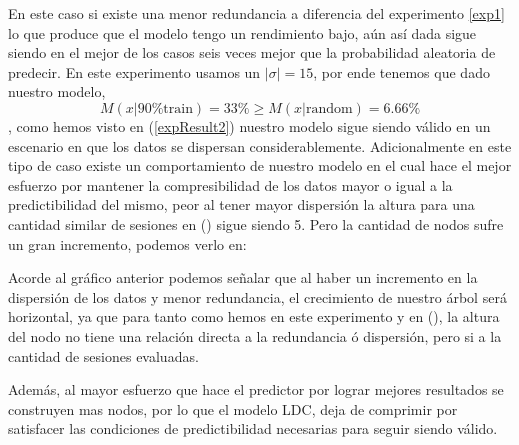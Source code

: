 \begin{enumerate}
	En este caso si existe una menor redundancia a diferencia del experimento \ref{exp1} lo que produce que el modelo tengo un rendimiento bajo, aún así dada sigue siendo en el mejor de los casos seis veces mejor que la probabilidad aleatoria de predecir. En este experimento usamos un $|\sigma| =15$, por ende tenemos que dado nuestro modelo,
	\begin{equation}\label{expResult2}
		M( x | \mbox{90\% train}  ) = 33 \% \geq M( x | \mbox{random}  ) = 6.66\% 
	\end{equation}, como hemos visto en (\ref{expResult2}) nuestro modelo sigue siendo válido en un escenario en que los datos se dispersan considerablemente. 
	Adicionalmente en este tipo de caso existe un comportamiento de nuestro modelo en el cual hace el mejor esfuerzo por mantener la compresibilidad de los datos mayor o igual a la predictibilidad del mismo, peor al tener mayor dispersión la altura para una cantidad similar de sesiones en (\label{expResult2}) sigue siendo 5. Pero la cantidad de nodos sufre un gran incremento, podemos verlo en:
	
	
	


	Acorde al gráfico anterior podemos señalar que al haber un incremento en la dispersión de los datos y menor redundancia, el crecimiento de nuestro árbol será horizontal, ya que para tanto como hemos en este experimento y en (\label{expResult2}), la altura del nodo no tiene una relación directa a la redundancia ó dispersión, pero si a la cantidad de sesiones evaluadas. 
	
	Además, al mayor esfuerzo que hace el predictor por lograr mejores resultados se construyen mas nodos, por lo que el modelo LDC, deja de comprimir por satisfacer las condiciones de predictibilidad necesarias para seguir siendo válido.


\end{enumerate}
